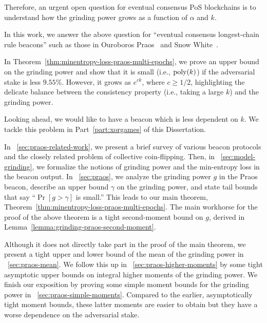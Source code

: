 Therefore, an urgent open question for eventual consensus PoS blockchains is to understand 
how the grinding power grows as a function of $\alpha$ and $k$. 


In this work, we answer the above question for ``eventual consensus longest-chain rule beacons'' such as those in 
Ouroboros Praos~\cite{Praos} and Snow White~\cite{SnowWhite}. 


In Theorem~\ref{thm:minentropy-loss-praos-multi-epochs}, 
we prove an upper bound on the grinding power 
and show that it is small (i.e., $\mathrm{poly}(k)$) if the adversarial stake is less $9.55\%$.
However, it grows as $e^{ck}$, where $c \geq 1/2$, 
highlighting the delicate balance between the consistency property 
(i.e., taking a large $k$) 
and the grinding power.

Looking ahead, we would like to have a beacon which is less dependent on $k$. 
We tackle this problem in Part~\ref{part:xorgames} of this Dissertation.



In \Section~\ref{sec:praos-related-work}, 
we present a brief survey of various beacon protocols 
and the closely related problem of collective coin-flipping. 
Then, in \Section~\ref{sec:model-grinding}, 
we formalize the notions of grinding power and the min-entropy loss in the beacon output. 
In \Section~\ref{sec:praos}, 
we analyze the grinding power $g$ in the Praos beacon, 
describe an upper bound $\gamma$ on the grinding power, 
and state tail bounds that say ``$\Pr[g > \gamma]$ is small.'' 
This leads to our main theorem, Theorem~\ref{thm:minentropy-loss-praos-multi-epochs}.
The main workhorse for the proof of the above theorem is 
a tight second-moment bound on $g$, derived in Lemma~\ref{lemma:grinding-praos-second-moment}. 

Although it does not directly take part in the proof of the main theorem, 
we present a tight upper and lower bound of the mean of the grinding power 
in \Section~\ref{sec:praos-mean}. 
We follow this up in \Section~\ref{sec:praos-higher-moments} by some tight asymptotic upper bounds on 
integral higher moments of the grinding power. 
We finish our exposition by proving some simple moment bounds for the grinding power 
in \Section~\ref{sec:praos-simple-moments}. 
Compared to the earlier, asymptotically tight moment bounds, 
these latter moments are easier to obtain but 
they have a worse dependence on the adversarial stake.

